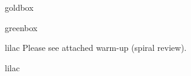\documentclass[10pt]{article}
\begin{document}
\renewcommand{\arraystretch}{1.6}
\begin{skillbox}{goldbox}
\end{skillbox}

\begin{skillbox}{greenbox}
\end{skillbox}

\begin{skillbox}{lilac}
    Please see attached warm-up (spiral review).
\end{skillbox}

\begin{skillbox}{lilac}
\end{skillbox}
\end{document}
